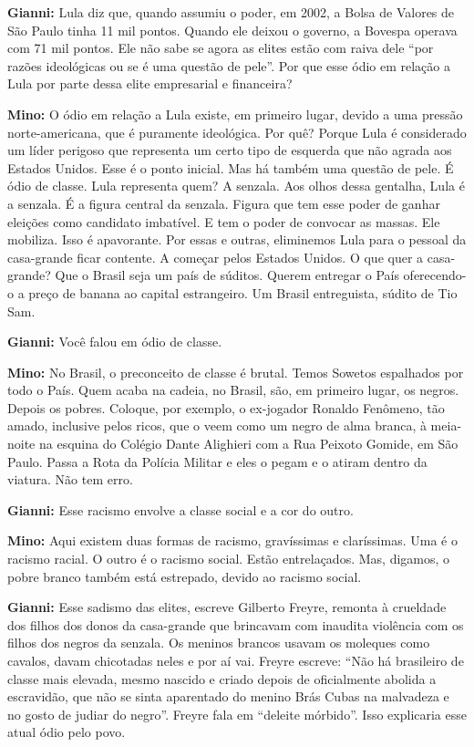 \textbf{Gianni:} Lula diz que, quando assumiu o poder, em 2002, a Bolsa
de Valores de São Paulo tinha 11 mil pontos. Quando ele deixou o
governo, a Bovespa operava com 71 mil pontos. Ele não sabe se agora as
elites estão com raiva dele ``por razões ideológicas ou se é uma questão
de pele''. Por que esse ódio em relação a Lula por parte dessa elite
empresarial e financeira?

\textbf{Mino:} O ódio em relação a Lula existe, em primeiro lugar,
devido a uma pressão norte-americana, que é puramente ideológica.
\protect\hypertarget{_Hlk498163994}{}{}Por quê? Porque Lula é
considerado um líder perigoso que representa um certo tipo de esquerda
que não agrada aos Estados Unidos. Esse é o ponto inicial. Mas há também
uma questão de pele. É ódio de classe. Lula representa quem? A senzala.
Aos olhos dessa gentalha, Lula é a senzala. É a figura central da
senzala. Figura que tem esse poder de ganhar eleições como candidato
imbatível. E tem o poder de convocar as massas. Ele mobiliza. Isso é
apavorante. Por essas e outras, eliminemos Lula para o pessoal da
casa-grande ficar contente. A começar pelos Estados Unidos. O que quer a
casa-grande? Que o Brasil seja um país de súditos. Querem entregar o
País oferecendo-o a preço de banana ao capital estrangeiro. Um Brasil
entreguista, súdito de Tio Sam.

\textbf{Gianni:} Você falou em ódio de classe.

\textbf{Mino:} No Brasil, o preconceito de classe é brutal. Temos
Sowetos espalhados por todo o País. Quem acaba na cadeia, no Brasil,
são, em primeiro lugar, os negros. Depois os pobres. Coloque, por
exemplo, o ex-jogador Ronaldo Fenômeno, tão amado, inclusive pelos
ricos, que o veem como um negro de alma branca, à meia-noite na esquina
do Colégio Dante Alighieri com a Rua Peixoto Gomide, em São Paulo. Passa
a Rota da Polícia Militar e eles o pegam e o atiram dentro da viatura.
Não tem erro.

\textbf{Gianni:} Esse racismo envolve a classe social e a cor do outro.

\textbf{Mino:} Aqui existem duas formas de racismo, gravíssimas e
claríssimas. Uma é o racismo racial. O outro é o racismo social. Estão
entrelaçados. Mas, digamos, o pobre branco também está estrepado, devido
ao racismo social.

\textbf{Gianni:} Esse sadismo das elites, escreve Gilberto Freyre,
remonta à crueldade dos filhos dos donos da casa-grande que brincavam
com inaudita violência com os filhos dos negros da senzala. Os meninos
brancos usavam os moleques como cavalos, davam chicotadas neles e por aí
vai. Freyre escreve: ``Não há brasileiro de classe mais elevada, mesmo
nascido e criado depois de oficialmente abolida a escravidão, que não se
sinta aparentado do menino Brás Cubas na malvadeza e no gosto de judiar
do negro''. Freyre fala em ``deleite mórbido''. Isso explicaria esse
atual ódio pelo povo.

